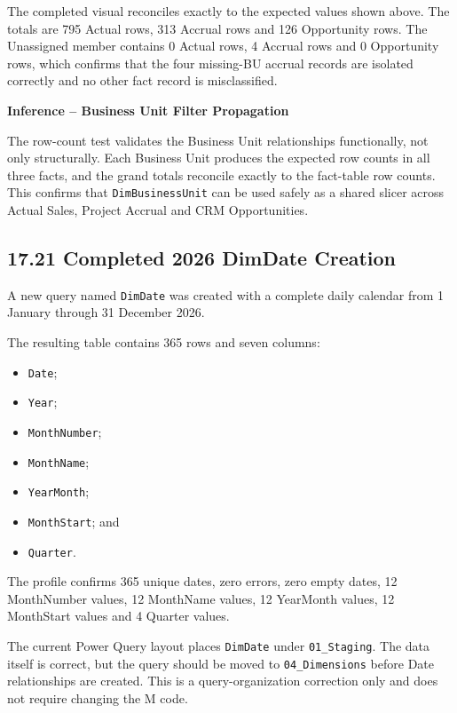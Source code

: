 \documentclass[11pt,a4paper]{article}
\begin{document}
The completed visual reconciles exactly to the expected values shown above.
The totals are 795 Actual rows, 313 Accrual rows and 126 Opportunity rows.
The Unassigned member contains 0 Actual rows, 4 Accrual rows and 0 Opportunity
rows, which confirms that the four missing-BU accrual records are isolated
correctly and no other fact record is misclassified.

\begin{inferencebox}

\textbf{Inference -- Business Unit Filter Propagation}

The row-count test validates the Business Unit relationships functionally, not
only structurally. Each Business Unit produces the expected row counts in all
three facts, and the grand totals reconcile exactly to the fact-table row
counts. This confirms that \texttt{DimBusinessUnit} can be used safely as a
shared slicer across Actual Sales, Project Accrual and CRM Opportunities.

\end{inferencebox}

\subsection{17.21 Completed 2026 DimDate Creation}

A new query named \texttt{DimDate} was created with a complete daily calendar
from 1 January through 31 December 2026.

The resulting table contains 365 rows and seven columns:

\begin{itemize}[leftmargin=7mm,itemsep=2pt]
    \item \texttt{Date};
    \item \texttt{Year};
    \item \texttt{MonthNumber};
    \item \texttt{MonthName};
    \item \texttt{YearMonth};
    \item \texttt{MonthStart}; and
    \item \texttt{Quarter}.
\end{itemize}

The profile confirms 365 unique dates, zero errors, zero empty dates,
12 MonthNumber values, 12 MonthName values, 12 YearMonth values,
12 MonthStart values and 4 Quarter values.

\begin{warningbox}

The current Power Query layout places \texttt{DimDate} under
\texttt{01\_Staging}. The data itself is correct, but the query should be moved
to \texttt{04\_Dimensions} before Date relationships are created. This is a
query-organization correction only and does not require changing the M code.

\end{warningbox}
\end{document}
